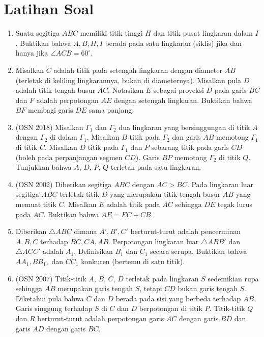 \documentclass[11pt]{scrartcl}
\begin{document}
    \section{Latihan Soal}
    \begin{enumerate}
        \item Suatu segitiga $ABC$ memiliki titik tinggi $H$ dan titik pusat lingkaran dalam $I$. Buktikan bahwa $A,B,H,I$ berada pada satu lingkaran (siklis) jika dan hanya jika $\angle ACB = 60^\circ$.
        
        \item Misalkan $C$ adalah titik pada setengah lingkaran dengan diameter $AB$ (terletak di keliling lingkarannya, bukan di diameternya). Misalkan pula $D$ adalah titik tengah busur $AC$. Notasikan $E$ sebagai proyeksi $D$ pada garis $BC$ dan $F$ adalah perpotongan $AE$ dengan setengah lingkaran. Buktikan bahwa $BF$ membagi garis $DE$ sama panjang.
        
        \item (OSN 2018) Misalkan $\Gamma_1$ dan $\Gamma_2$ dua lingkaran yang bersinggungan di titik $A$ dengan $\Gamma_2$ di dalam $\Gamma_1$. Misalkan $B$ titik pada $\Gamma_2$ dan garis $AB$ memotong $\Gamma_1$ di titik $C$. Misalkan $D$ titik pada $\Gamma_1$ dan $P$ sebarang titik pada garis $CD$ (boleh pada perpanjangan segmen $CD$). Garis $BP$ memotong $\Gamma_2$ di titik $Q$. Tunjukkan bahwa $A$, $D$, $P$, $Q$ terletak pada satu lingkaran.

        \item (OSN 2002) Diberikan segitiga $ABC$ dengan $AC > BC$. Pada lingkaran luar segitiga $ABC$ terletak titik $D$ yang merupakan titik tengah busur $AB$ yang memuat titik $C$. Misalkan $E$ adalah titik pada $AC$ sehingga $DE$ tegak lurus pada $AC$. Buktikan bahwa $AE = EC + CB$.

        \item Diberikan $\triangle ABC$ dimana $A',B',C'$ berturut-turut adalah pencerminan $A,B,C$ terhadap $BC,CA,AB$. Perpotongan lingkaran luar $\triangle ABB'$ dan $\triangle ACC'$ adalah $A_1$. Definisikan $B_1$ dan $C_1$ secara serupa. Buktikan bahwa $AA_1,BB_1,$ dan $CC_1$ konkuren (bertemu di satu titik).

        \item (OSN 2007) Titik-titik $A$, $B$, $C$, $D$ terletak pada lingkaran $S$ sedemikian rupa sehingga $AB$ merupakan garis tengah $S$, tetapi $CD$ bukan garis tengah $S$. Diketahui pula bahwa $C$ dan $D$ berada pada sisi yang berbeda terhadap $AB$. Garis singgung terhadap $S$ di $C$ dan $D$ berpotongan di titik $P$. Titik-titik $Q$ dan $R$ berturut-turut adalah perpotongan garis $AC$ dengan garis $BD$ dan garis $AD$ dengan garis $BC$.
        

\end{enumerate}
\end{document}
